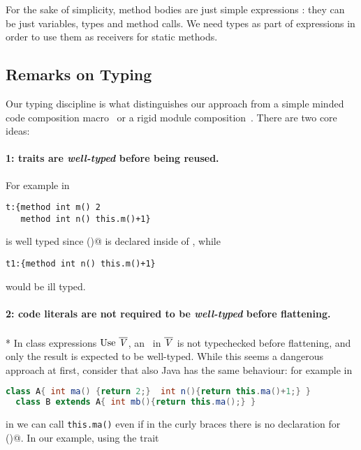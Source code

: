 For the sake of simplicity, method bodies are just simple expressions
\me: they can be just variables, types and method calls. We need types as part of expressions in order to use them as receivers for static methods.

\subsection{Remarks on Typing}
 Our typing discipline is 
what distinguishes our approach from a simple minded code composition macro~\cite{bawden1999quasiquotation}
or a rigid module composition~\cite{ancona2002calculus}.
There are two core ideas:

\paragraph{1: traits are \emph{well-typed} before being reused.}
 For example in

\saveSpace\begin{lstlisting}
t:{method int m() 2 
   method int n() this.m()+1}
\end{lstlisting}\saveSpace

\noindent \Q@t@ is well typed since \Q@m()@ is declared inside of \Q@t@, while

\saveSpace\begin{lstlisting}
t1:{method int n() this.m()+1} 
\end{lstlisting}\saveSpace
\noindent would be ill typed.

\paragraph{2: code literals are not required to be \emph{well-typed} before flattening.}${}_{}$\\*
In class expressions  $\use\ \overline\mV$,
an \mL\ in $\overline{\mathit{V}}$ is not typechecked before flattening, and only the result is expected to be well-typed.
While this seems a dangerous approach at first, consider that also Java has the same behaviour:
for example in
\saveSpace\begin{lstlisting}[language=Java]
  class A{ int ma() {return 2;}  int n(){return this.ma()+1;} }
  class B extends A{ int mb(){return this.ma();} }
\end{lstlisting}\saveSpace
\noindent in \Q@B@ we can call \lstinline{this.ma()} even if in the curly braces there is no declaration for \Q@ma()@.
In our example, using the trait \Q@t@

